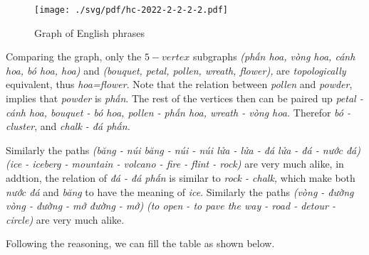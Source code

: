 \begin{multicols}{2}
\begin{soln}
		\begin{figure}[h]
			\centering
			\begin{minipage}[t]{11cm}
				\centering
				\texttt{[image: ./svg/pdf/hc-2022-2-2-2-2.pdf]}
				\caption{Graph of English phrases}
			\end{minipage}
		\end{figure}
		
		\begin{otherlanguage}{vietnamese}
			
			Comparing the graph, only the $5-vertex$ subgraphs \textit{(phấn hoa, vòng hoa, cánh hoa, bó hoa, hoa)} and
			\textit{(bouquet, petal, pollen, wreath, flower),} are \textit{topologically} equivalent, thus \textit{hoa=flower}.
			Note that the relation between \textit{pollen} and \textit{powder},
			implies that \textit{powder} is \textit{phấn}. The rest of the vertices then can be paired up
			\textit{petal - cánh hoa, bouquet - bó hoa, pollen - phấn hoa, wreath - vòng hoa.}
			Therefor \textit{bó - cluster}, and \textit{chalk - đá phấn.}
			
			Similarly the paths \textit{(băng - núi băng - núi - núi lửa - lửa - đá lửa - đá - nước đá)} 
			\textit{(ice - iceberg - mountain - volcano - fire - flint - rock)} are very much alike,
			in addtion, the relation of \textit{đá - đá phấn} is similar to \textit{rock - chalk,}
			which make both \textit{nước đá} and \textit{băng} to have the meaning of \textit{ice}.
			Similarly the paths \textit{(vòng - đường vòng - đường - mở đường - mở)} 
			\textit{(to open - to pave the way - road - detour - circle)} are very much alike.
			
			\newpage
			
			Following the reasoning, we can fill the table as shown below.
			

\end{otherlanguage}
\end{soln}
\end{multicols}
